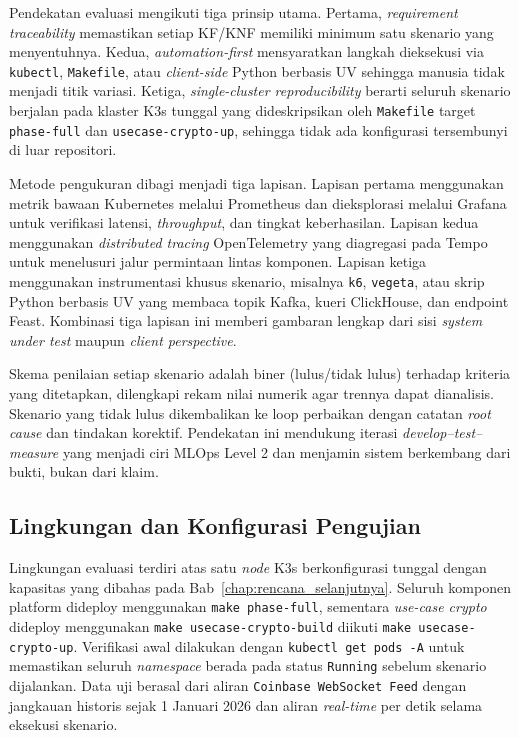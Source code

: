 Pendekatan evaluasi mengikuti tiga prinsip utama. Pertama, \textit{requirement traceability} memastikan setiap KF/KNF memiliki minimum satu skenario yang menyentuhnya. Kedua, \textit{automation-first} mensyaratkan langkah dieksekusi via \texttt{kubectl}, \texttt{Makefile}, atau \textit{client-side} Python berbasis UV sehingga manusia tidak menjadi titik variasi. Ketiga, \textit{single-cluster reproducibility} berarti seluruh skenario berjalan pada klaster K3s tunggal yang dideskripsikan oleh \texttt{Makefile} target \texttt{phase-full} dan \texttt{usecase-crypto-up}, sehingga tidak ada konfigurasi tersembunyi di luar repositori.

Metode pengukuran dibagi menjadi tiga lapisan. Lapisan pertama menggunakan metrik bawaan Kubernetes melalui Prometheus dan dieksplorasi melalui Grafana untuk verifikasi latensi, \textit{throughput}, dan tingkat keberhasilan. Lapisan kedua menggunakan \textit{distributed tracing} OpenTelemetry yang diagregasi pada Tempo untuk menelusuri jalur permintaan lintas komponen. Lapisan ketiga menggunakan instrumentasi khusus skenario, misalnya \texttt{k6}, \texttt{vegeta}, atau skrip Python berbasis UV yang membaca topik Kafka, kueri ClickHouse, dan endpoint Feast. Kombinasi tiga lapisan ini memberi gambaran lengkap dari sisi \textit{system under test} maupun \textit{client perspective}.

Skema penilaian setiap skenario adalah biner (lulus/tidak lulus) terhadap kriteria yang ditetapkan, dilengkapi rekam nilai numerik agar trennya dapat dianalisis. Skenario yang tidak lulus dikembalikan ke loop perbaikan dengan catatan \textit{root cause} dan tindakan korektif. Pendekatan ini mendukung iterasi \textit{develop--test--measure} yang menjadi ciri MLOps Level 2 dan menjamin sistem berkembang dari bukti, bukan dari klaim.

\subsection{Lingkungan dan Konfigurasi Pengujian}
\label{sec:lingkungan_pengujian}

Lingkungan evaluasi terdiri atas satu \textit{node} K3s berkonfigurasi tunggal dengan kapasitas yang dibahas pada Bab~\ref{chap:rencana_selanjutnya}. Seluruh komponen platform dideploy menggunakan \texttt{make phase-full}, sementara \textit{use-case crypto} dideploy menggunakan \texttt{make usecase-crypto-build} diikuti \texttt{make usecase-crypto-up}. Verifikasi awal dilakukan dengan \texttt{kubectl get pods -A} untuk memastikan seluruh \textit{namespace} berada pada status \texttt{Running} sebelum skenario dijalankan. Data uji berasal dari aliran \texttt{Coinbase WebSocket Feed} dengan jangkauan historis sejak 1 Januari 2026 dan aliran \textit{real-time} per detik selama eksekusi skenario.

